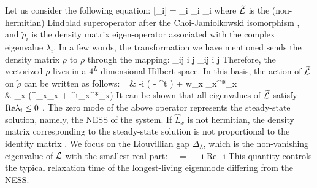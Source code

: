 Let us consider the following equation:
	[\widetilde \rho_i] = \lambda_i \widetilde \rho_i \cm
	\qquad \lambda_i \in {} \pc
\ea
where $\widetilde {\cal L}$ is the (non-hermitian) Lindblad superoperator after the 
Choi-Jamiolkowski isomorphism 
\cite{BP-openquantumsystembook, VZ-2004-superoperatorvidal}, and $\widetilde \rho_i$ is the
density matrix eigen-operator associated with the complex eigenvalue $\lambda_i$.
In a few words, the transformation we have mentioned sends the density matrix $\rho$ to 
$\widetilde \rho$ through the mapping:
	\rho_{ij} \ket i \bra j  \longrightarrow  \widetilde \rho_{ij} \ket i \ket j \pt
\ee
Therefore, the vectorized $\widetilde \rho$ lives in a $4^L$-dimensional Hilbert space.
In this basis, the action of $\widetilde{\cal L}$ on 
$\widetilde \rho$ can be written as follows:
	 =& -i \big( \otimes {} 
		- \otimes {}^t \big) + 
		w\sum_{x }_{x}\otimes {}^*_{x}\\
	&-\sum_{x }\big(^{\dagger}_{x}_{x}
		\otimes{}+
			\otimes\hat{L}^t_{x}^*_{x}\big) \pt
\ea
It can be shown that all eigenvalues of $\widetilde{\cal L}$ satisfy 
$ {\rm Re}{\lambda_i } \le 0$ \cite{BP-openquantumsystembook}. The zero mode of the above 
operator represents the steady-state solution, namely, the NESS of the system. 
If $\hat L_x$ is not hermitian, the density matrix corresponding to the steady-state 
solution is not proportional to the identity matrix \cite{KS-2020-boundarydephasing}. 
We focus on the Liouvillian gap $\Delta_{\lambda}$, which is the non-vanishing eigenvalue
of ${\cal L}$ with the smallest real part:
\Delta_{\lambda} = - \max_{i} {\rm Re}{\lambda_i } \pt
\ea
This quantity controls the typical relaxation time of the longest-living 
eigenmode differing from the NESS.
